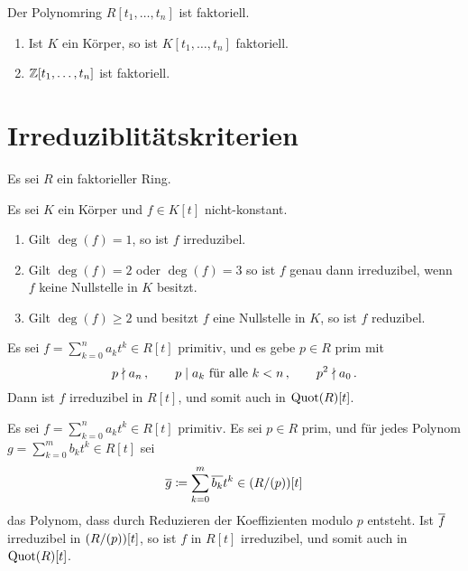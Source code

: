 \begin{corollary}
  Der Polynomring $R[t_1, \dotsc, t_n]$ ist faktoriell.
\end{corollary}

\begin{example}
  \begin{enumerate}
    \item
      Ist $K$ ein Körper, so ist $K[t_1, \dotsc, t_n]$ faktoriell.
    \item
      $\mathbb{Z}[t_1, \dotsc, t_n]$ ist faktoriell.
  \end{enumerate}
\end{example}





\section{Irreduziblitätskriterien}

Es sei $R$ ein faktorieller Ring.

\begin{lemma}
  Es sei $K$ ein Körper und $f \in K[t]$ nicht-konstant.
  \begin{enumerate}
    \item
      Gilt $\deg(f) = 1$, so ist $f$ irreduzibel.
    \item
      Gilt $\deg(f) = 2$ oder $\deg(f) = 3$ so ist $f$ genau dann irreduzibel, wenn $f$ keine Nullstelle in $K$ besitzt.
    \item
      Gilt $\deg(f) \geq 2$ und besitzt $f$ eine Nullstelle in $K$, so ist $f$ reduzibel.
  \end{enumerate}
\end{lemma}


\begin{proposition}[Eisenstein]
  Es sei $f = \sum_{k=0}^n a_k t^k \in R[t]$ primitiv, und es gebe $p \in R$ prim mit
  \[
    p \mathrel{\nmid} a_n \,,
    \qquad
    \text{$p \mathrel{|} a_k$ für alle $k < n$} \,,
    \qquad
    p^2 \mathrel{\nmid} a_0 \,.
  \]
  Dann ist $f$ irreduzibel in $R[t]$, und somit auch in $\operatorname{Quot}(R)[t]$.
\end{proposition}

\begin{proposition}[Reduktionskriterium]
  Es sei $f = \sum_{k=0}^n a_k t^k \in R[t]$ primitiv.
  Es sei $p \in R$ prim, und für jedes Polynom $g = \sum_{k=0}^m b_k t^k \in R[t]$ sei
  \[
              \overline{g}
    \coloneqq  \sum_{k=0}^m \overline{b_k} t^k
    \in       (R/(p))[t]
  \]
  das Polynom, dass durch Reduzieren der Koeffizienten modulo $p$ entsteht.
  Ist $\overline{f}$ irreduzibel in $(R/(p))[t]$, so ist $f$ in $R[t]$ irreduzibel, und somit auch in $\operatorname{Quot}(R)[t]$.
\end{proposition}







